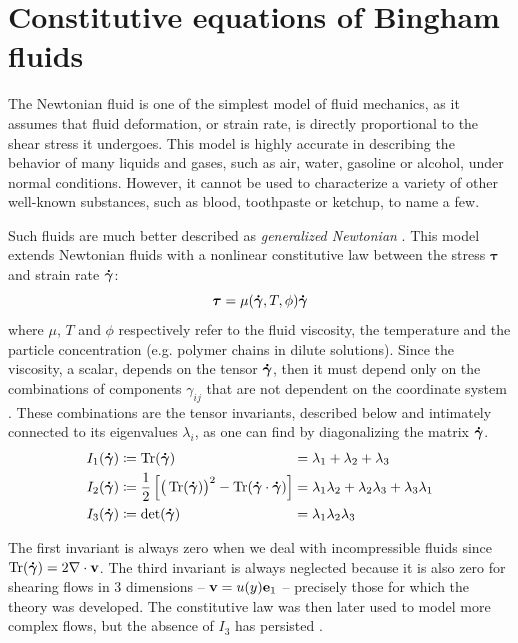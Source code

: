 \documentclass[11 pt]{report}
\begin{document}
\section{Constitutive equations of Bingham fluids}

The Newtonian fluid is one of the simplest model of fluid mechanics, as it assumes that fluid deformation, or strain rate, is directly proportional to the shear stress it undergoes. This model is highly accurate in describing the behavior of many liquids and gases, such as air, water, gasoline or alcohol, under normal conditions. However, it cannot be used to characterize a variety of other well-known substances, such as blood, toothpaste or ketchup, to name a few.

Such fluids are much better described as \textit{generalized Newtonian} \cite{Geophysical}. This model extends Newtonian fluids with a nonlinear constitutive law between the stress $\boldsymbol\tau$ and strain rate $\boldsymbol{\dot \gamma}$:
\begin{equation}
    \boldsymbol\tau = \mu(\boldsymbol{\dot \gamma}, T, \phi) \boldsymbol{\dot \gamma}
    \label{eq:power-law}
\end{equation}
where $\mu$, $T$ and $\phi$ respectively refer to the fluid viscosity, the temperature and the particle concentration (e.g. polymer chains in dilute solutions). Since the viscosity, a scalar, depends on the tensor $\boldsymbol{\dot \gamma}$, then it must depend only on the combinations of components $\gamma_{ij}$ that are not dependent on the coordinate system \cite{bird1987dynamics}. These combinations are the tensor invariants, described below and intimately connected to its eigenvalues $\lambda_i$, as one can find by diagonalizing the matrix $\boldsymbol{\dot \gamma}$.
\begin{equation}
    \begin{alignedat}{2}
        I_1(\boldsymbol{\dot \gamma}) &\coloneqq \Tr(\boldsymbol{\dot \gamma}) &&= \lambda_1 + \lambda_2 + \lambda_3\\
        I_2(\boldsymbol{\dot \gamma}) &\coloneqq \frac{1}{2} \left[\big(\Tr(\boldsymbol{\dot \gamma})\big)^2 - \Tr(\boldsymbol{\dot \gamma} \cdot \boldsymbol{\dot \gamma})\right] &&= \lambda_1\lambda_2 + \lambda_2\lambda_3 + \lambda_3\lambda_1\\
        I_3(\boldsymbol{\dot \gamma}) &\coloneqq \det(\boldsymbol{\dot \gamma}) &&= \lambda_1\lambda_2\lambda_3
    \end{alignedat}
\end{equation}

The first invariant is always zero when we deal with incompressible fluids since $\Tr(\boldsymbol{\dot \gamma}) = 2 \nabla \cdot \mathbf{v}$. The third invariant is always neglected because it is also zero for shearing flows in 3 dimensions -- $\mathbf{v} = u(y)\mathbf{e}_1$ -- precisely those for which the theory was developed. The constitutive law was then later used to model more complex flows, but the absence of $I_3$ has persisted \cite{bird1987dynamics}.
\end{document}
